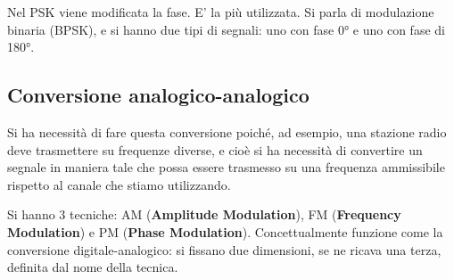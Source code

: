         \vspace{3mm}
        
        Nel PSK viene modificata la fase. E' la più utilizzata. Si parla di modulazione binaria (BPSK), e si hanno due tipi di segnali: uno con fase 0° e uno con fase di 180°.
        
    \subsection{Conversione analogico-analogico}
    
        Si ha necessità di fare questa conversione poiché, ad esempio, una stazione radio deve trasmettere su frequenze diverse, e cioè si ha necessità di convertire un segnale in maniera tale che possa essere trasmesso su una frequenza ammissibile rispetto al canale che stiamo utilizzando. 
        
        Si hanno 3 tecniche: AM (\textbf{Amplitude Modulation}), FM (\textbf{Frequency Modulation}) e PM (\textbf{Phase Modulation}). Concettualmente funzione come la conversione digitale-analogico: si fissano due dimensioni, se ne ricava una terza, definita dal nome della tecnica.